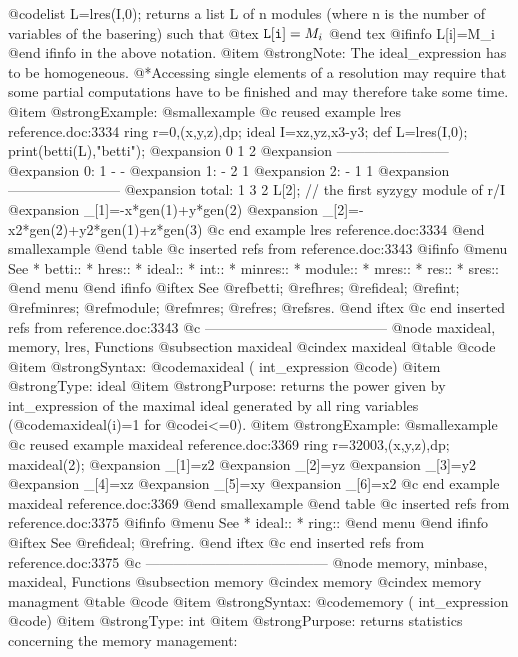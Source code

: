 {@code{list L=lres(I,0);} returns a list L of n modules (where n is the
number of variables of the basering) such that
@tex
${\tt L[i]}=M_i$
@end tex
@ifinfo
L[i]=M_i
@end ifinfo
in the above notation.
@item @strong{Note:}
The ideal_expression has to be homogeneous.
@*Accessing single elements of a resolution may require that some partial
computations have to be finished and may therefore take some time.
@item @strong{Example:}
@smallexample
@c reused example lres reference.doc:3334 
  ring r=0,(x,y,z),dp;
  ideal I=xz,yz,x3-y3;
  def L=lres(I,0);
  print(betti(L),"betti");
@expansion{}            0     1     2
@expansion{} ------------------------
@expansion{}     0:     1     -     -
@expansion{}     1:     -     2     1
@expansion{}     2:     -     1     1
@expansion{} ------------------------
@expansion{} total:     1     3     2
  L[2];     // the first syzygy module of r/I
@expansion{} _[1]=-x*gen(1)+y*gen(2)
@expansion{} _[2]=-x2*gen(2)+y2*gen(1)+z*gen(3)
@c end example lres reference.doc:3334
@end smallexample
@end table
@c inserted refs from reference.doc:3343
@ifinfo
@menu
See
* betti::
* hres::
* ideal::
* int::
* minres::
* module::
* mres::
* res::
* sres::
@end menu
@end ifinfo
@iftex
See
@ref{betti};
@ref{hres};
@ref{ideal};
@ref{int};
@ref{minres};
@ref{module};
@ref{mres};
@ref{res};
@ref{sres}.
@end iftex
@c end inserted refs from reference.doc:3343
@c ---------------------------------------
@node maxideal, memory, lres, Functions
@subsection maxideal
@cindex maxideal
@table @code
@item @strong{Syntax:}
@code{maxideal (} int_expression @code{)}
@item @strong{Type:}
ideal
@item @strong{Purpose:}
returns the power given by int_expression of the maximal ideal
generated by all ring variables (@code{maxideal(i)=1} for @code{i<=0}).
@item @strong{Example:}
@smallexample
@c reused example maxideal reference.doc:3369 
  ring r=32003,(x,y,z),dp;
  maxideal(2);
@expansion{} _[1]=z2
@expansion{} _[2]=yz
@expansion{} _[3]=y2
@expansion{} _[4]=xz
@expansion{} _[5]=xy
@expansion{} _[6]=x2
@c end example maxideal reference.doc:3369
@end smallexample
@end table
@c inserted refs from reference.doc:3375
@ifinfo
@menu
See
* ideal::
* ring::
@end menu
@end ifinfo
@iftex
See
@ref{ideal};
@ref{ring}.
@end iftex
@c end inserted refs from reference.doc:3375
@c ---------------------------------------
@node  memory, minbase, maxideal, Functions
@subsection memory
@cindex memory
@cindex memory managment
@table @code
@item @strong{Syntax:}
@code{memory (} int_expression @code{)}
@item @strong{Type:}
int
@item @strong{Purpose:}
returns statistics concerning the memory management:
}
